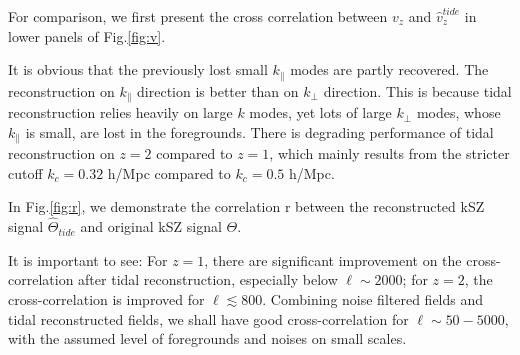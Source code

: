 \label{ssec:tide}
For comparison, we first present the cross correlation between $v_z$ and $\hat v_z^{tide}$ in lower panels of Fig.\ref{fig:v}. 

It is obvious that the previously lost small $k_\parallel$ modes are partly recovered. 
The reconstruction on $k_\parallel$ direction is better than on $k_\perp$ direction.
This is because tidal reconstruction relies heavily on large $k$ modes, 
yet lots of large $k_\perp$ modes, whose $k_\parallel$ is small, are lost in the foregrounds. 
There is degrading performance of tidal reconstruction on $z=2$ compared to $z=1$, 
which mainly results from the stricter cutoff $k_c=0.32$ h/Mpc compared to $k_c=0.5$ h/Mpc.

In Fig.\ref{fig:r}, 
we demonstrate the correlation r between the reconstructed kSZ signal $\hat \Theta_{tide}$ and original kSZ signal $\Theta$. 

It is important to see:
For $z=1$, there are significant improvement on the cross-correlation after tidal reconstruction, especially below $\ell \sim 2000$; 
for $z=2$, the cross-correlation is improved for $\ell \lesssim 800$. 
Combining noise filtered fields and tidal reconstructed fields, we shall have good cross-correlation for $\ell  \sim 50-5000$, 
with the assumed level of foregrounds and noises on small scales.



